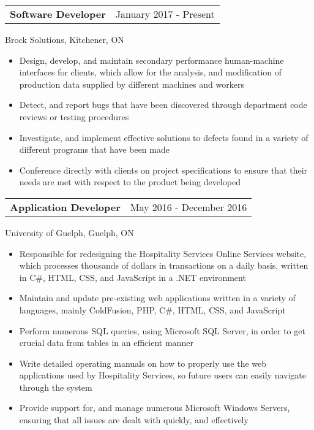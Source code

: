 \documentclass[12pt]{article}
\newcommand{\doublespace}{\vspace{8pt}}
\begin{document}
{
  \small
  \noindent\begin{tabu} {@{} X[l] X[r]}
    \textbf{Software Developer} & January 2017 - Present
  \end{tabu}
  Brock Solutions, Kitchener, ON
  \begin{itemize}
    \item Design, develop, and maintain secondary performance human-machine interfaces for clients, which allow for the analysis, and modification of production data supplied by different machines and workers
    \item Detect, and report bugs that have been discovered through department code reviews or testing procedures 
    \item Investigate, and implement effective solutions to defects found in a variety of different programs that have been made
    \item Conference directly with clients on project specifications to ensure that their needs are met with respect to the product being developed
  \end{itemize}
}

\doublespace

{
  \small
  \noindent\begin{tabu} {@{} X[l] X[r]}
    \textbf{Application Developer} & May 2016 - December 2016
  \end{tabu}
  University of Guelph, Guelph, ON
  \begin{itemize}
    \item Responsible for redesigning the Hospitality Services Online Services website, which processes thousands of dollars in transactions on a daily basis, written in C\#, HTML, CSS, and JavaScript in a .NET environment
    \item Maintain and update pre-existing web applications written in a variety of languages, mainly ColdFusion, PHP, C\#, HTML, CSS, and JavaScript
    \item Perform numerous SQL queries, using Microsoft SQL Server, in order to get crucial data from tables in an efficient manner
    \item Write detailed operating manuals on how to properly use the web applications used by Hospitality Services, so future users can easily navigate through the system
    \item Provide support for, and manage numerous Microsoft Windows Servers, ensuring that all issues are dealt with quickly, and effectively
  \end{itemize}
}
\end{document}

